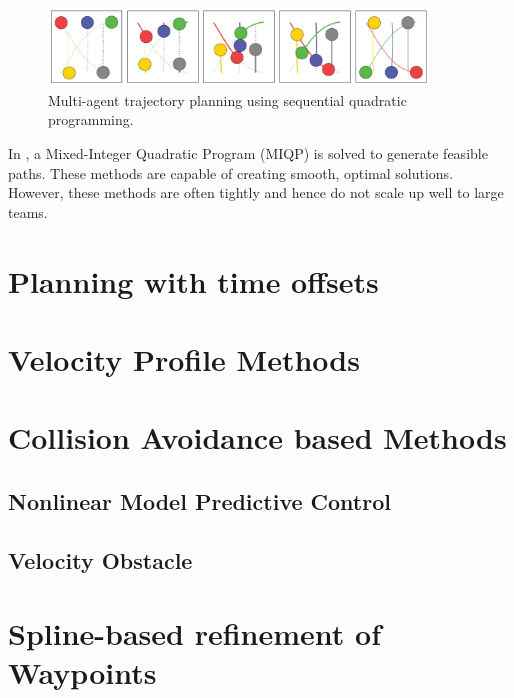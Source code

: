 \begin{figure}
\centering
\includegraphics[width=0.9\textwidth]{./images/dandrea_scp.png}
\caption{Multi-agent trajectory planning using sequential quadratic programming. \cite{augugliaro2012generation}}
\end{figure}

In \cite{mellinger2012mixed}, a Mixed-Integer Quadratic Program (MIQP) is solved to generate feasible paths. These methods are capable of creating smooth, optimal solutions. However, these methods are often tightly and hence do not scale  up well to large teams. 
\section{Planning with time offsets}

\section{Velocity Profile Methods}
\section{Collision Avoidance based Methods}
\subsection{Nonlinear Model Predictive Control}
\subsection{Velocity Obstacle}

\section{Spline-based refinement of Waypoints}
